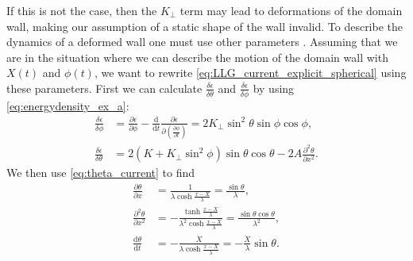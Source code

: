 \documentclass[12pt, a4paper, twoside, openright]{article}		%
\numberwithin{equation}{section}
\begin{document}
If this is not the case, then the $K_{\perp}$ term may lead to deformations of the domain wall, making our assumption of a static shape of the wall invalid. To describe the dynamics of a deformed wall one must use other parameters \cite{TataraKohnoShibata2008}. Assuming that we are in the situation where we can describe the motion of the domain wall with $X(t)$ and $\phi(t)$, we want to rewrite \eqref{eq:LLG_current_explicit_spherical} using these parameters. First we can calculate $\frac{\delta \epsilon}{\delta \theta}$ and $\frac{\delta \epsilon}{\delta \phi}$ by using \eqref{eq:energydensity_ex_a}:
\begin{align}
\frac{\delta \epsilon}{\delta \phi} &= \frac{\partial \epsilon}{\partial \phi} - \frac{\textrm{d}}{\textrm{d} t} \frac{\partial \epsilon}{\partial (\frac{\partial \phi}{\partial t})} = 2K_{\perp}\sin^2 \theta\sin\phi\cos\phi, \\
\frac{\delta \epsilon}{\delta \theta} &= 2(K+K_{\perp} \sin^2 \phi)\sin\theta\cos\theta - 2A\frac{\partial^2 \theta}{\partial x^2}.
\end{align}
We then use \eqref{eq:theta_current}  to find
\begin{align}
\frac{\partial \theta}{\partial x} &=  \frac{1}{\lambda\cosh\frac{x-X}{\lambda}} = \frac{\sin\theta}{\lambda}, \\
\frac{\partial^2 \theta}{\partial x^2} &=  -\frac{\tanh\frac{x-X}{\lambda}}{\lambda^2\cosh\frac{x-X}{\lambda}} = \frac{\sin\theta\cos\theta}{\lambda^2}, \\
\frac{\textrm{d} \theta}{\textrm{d} t} &= -\frac{\dot{X}}{\lambda\cosh\frac{x-X}{\lambda}} = -\frac{\dot{X}}{\lambda}\sin\theta.
\end{align}
\end{document}
